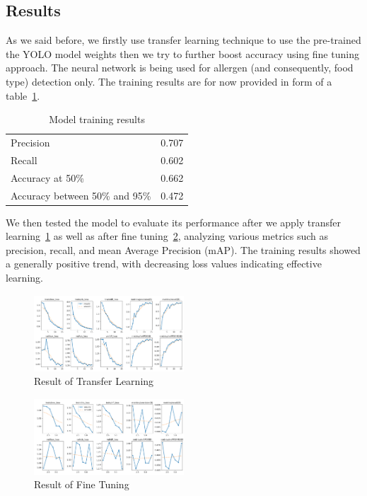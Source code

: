 \documentclass[10pt,twocolumn,letterpaper]{article}
\begin{document}
\subsection{Results}

As we said before, we firstly use transfer learning technique to use the pre-trained the YOLO model weights then we try to further boost accuracy using fine tuning approach.
The neural network is being used for allergen (and consequently, food type) detection only.
The training results are for now provided in form of a table~\ref{results-table}.

\begin{table}[!h]
    \begin{center}
        \caption{Model training results}\label{results-table}
        \begin{tabular}{ l c }
            \toprule
            Precision & 0.707 \\
            Recall & 0.602 \\
            Accuracy at 50\% & 0.662 \\
            Accuracy between 50\% and 95\% & 0.472 \\
            \bottomrule
        \end{tabular}
    \end{center}
\end{table}

We then tested the model to evaluate its performance after we apply transfer learning~\ref{transfer-learning-result} as well as after fine tuning~\ref{fine-tuning-result}, analyzing various metrics such as precision, recall, and mean Average Precision (mAP). 
The training results showed a generally positive trend, with decreasing loss values indicating effective learning. 

\begin{figure}[htbp]
    \centering
    \includegraphics[width=0.5\textwidth]{4471_transfer_learning.png}
    \caption{Result of Transfer Learning}\label{transfer-learning-result}
\end{figure}
\begin{figure}[htbp]
    \centering
    \includegraphics[width=0.5\textwidth]{4471_fine_tuning.png}
    \caption{Result of Fine Tuning}\label{fine-tuning-result}
\end{figure}
\end{document}
